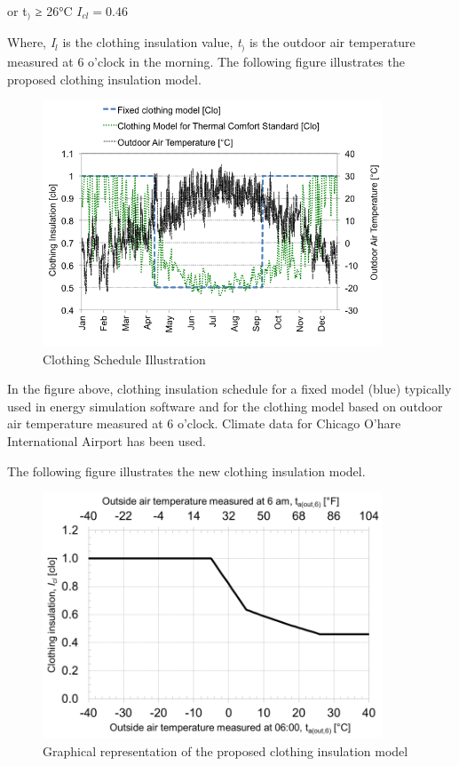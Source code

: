 or t\(_{)}\) ≥ 26°C \({I_{cl}} = 0.46\)

Where, \emph{I\(_{l}\)} is the clothing insulation value, \emph{t\(_{)}\)} is the outdoor air temperature measured at 6 o'clock in the morning. The following figure illustrates the proposed clothing insulation model.

\begin{figure}[hbtp] %
\centering
\includegraphics[width=0.9\textwidth, height=0.9\textheight, keepaspectratio=true]{media/image6825.png}
\caption{Clothing Schedule Illustration \protect \label{fig:clothing-schedule-illustration}}
\end{figure}

In the figure above, clothing insulation schedule for a fixed model (blue) typically used in energy simulation software and for the clothing model based on outdoor air temperature measured at 6 o'clock. Climate data for Chicago O'hare International Airport has been used.

The following figure illustrates the new clothing insulation model.

\begin{figure}[hbtp] %
\centering
\includegraphics[width=0.9\textwidth, height=0.9\textheight, keepaspectratio=true]{media/image6826.png}
\caption{Graphical representation of the proposed clothing insulation model \protect \label{fig:graphical-representation-of-the-proposed}}
\end{figure}


